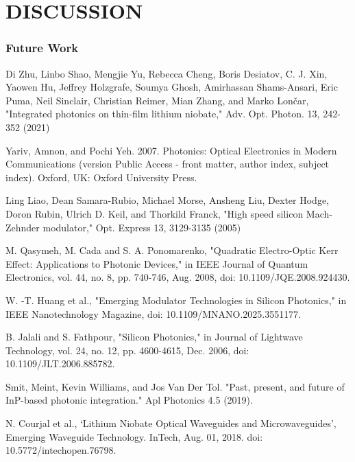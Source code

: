 \documentclass[thesis]{deutez}
\begin{document}



    
\chapter{DISCUSSION}
	
    

    \subsection{Future Work}
       




\begin{thebibliography}{30}
		 Di Zhu, Linbo Shao, Mengjie Yu, Rebecca Cheng, Boris Desiatov, C. J. Xin, Yaowen Hu, Jeffrey Holzgrafe, Soumya Ghosh, Amirhassan Shams-Ansari, Eric Puma, Neil Sinclair, Christian Reimer, Mian Zhang, and Marko Lončar, "Integrated photonics on thin-film lithium niobate," Adv. Opt. Photon. 13, 242-352 (2021)

         Yariv, Amnon, and Pochi Yeh. 2007. Photonics: Optical Electronics in Modern Communications (version Public Access - front matter, author index, subject index). Oxford, UK: Oxford University Press.

         Ling Liao, Dean Samara-Rubio, Michael Morse, Ansheng Liu, Dexter Hodge, Doron Rubin, Ulrich D. Keil, and Thorkild Franck, "High speed silicon Mach-Zehnder modulator," Opt. Express 13, 3129-3135 (2005)

         M. Qasymeh, M. Cada and S. A. Ponomarenko, "Quadratic Electro-Optic Kerr Effect: Applications to Photonic Devices," in IEEE Journal of Quantum Electronics, vol. 44, no. 8, pp. 740-746, Aug. 2008, doi: 10.1109/JQE.2008.924430.

         W. -T. Huang et al., "Emerging Modulator Technologies in Silicon Photonics," in IEEE Nanotechnology Magazine, doi: 10.1109/MNANO.2025.3551177.

         B. Jalali and S. Fathpour, "Silicon Photonics," in Journal of Lightwave Technology, vol. 24, no. 12, pp. 4600-4615, Dec. 2006, doi: 10.1109/JLT.2006.885782.

         Smit, Meint, Kevin Williams, and Jos Van Der Tol. "Past, present, and future of InP-based photonic integration." Apl Photonics 4.5 (2019).

         N. Courjal et al., ‘Lithium Niobate Optical Waveguides and Microwaveguides’, Emerging Waveguide Technology. InTech, Aug. 01, 2018. doi: 10.5772/intechopen.76798.


\end{thebibliography}
\end{document}
